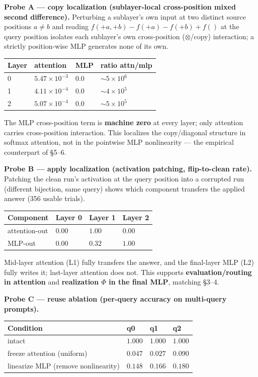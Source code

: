 \documentclass[a4paper,11pt]{article}
\begin{document}
\textbf{Probe A --- copy localization (sublayer-local cross-position
mixed second difference).} Perturbing a sublayer's own input at two
distinct source positions \(a\neq b\) and reading
\(f(+a,+b)-f(+a)-f(+b)+f()\) at the query position isolates each
sublayer's own cross-position (\(\otimes\)/copy) interaction; a strictly
position-wise MLP generates none of its own.

\begin{longtable}[]{@{}llll@{}}
\toprule
Layer & attention & MLP & ratio attn/mlp\tabularnewline
\midrule
\endhead
0 & \(5.47\times10^{-3}\) & \(0.0\) &
\(\sim 5\times10^{6}\)\tabularnewline
1 & \(4.11\times10^{-4}\) & \(0.0\) &
\(\sim 4\times10^{5}\)\tabularnewline
2 & \(5.07\times10^{-4}\) & \(0.0\) &
\(\sim 5\times10^{5}\)\tabularnewline
\bottomrule
\end{longtable}

The MLP cross-position term is \textbf{machine zero} at every layer;
only attention carries cross-position interaction. This localizes the
copy/diagonal structure in softmax attention, not in the pointwise MLP
nonlinearity --- the empirical counterpart of §5--6.

\textbf{Probe B --- apply localization (activation patching,
flip-to-clean rate).} Patching the clean run's activation at the query
position into a corrupted run (different bijection, same query) shows
which component transfers the applied answer (356 usable trials).

\begin{longtable}[]{@{}llll@{}}
\toprule
Component & Layer 0 & Layer 1 & Layer 2\tabularnewline
\midrule
\endhead
attention-out & \(0.00\) & \(\mathbf{1.00}\) & \(0.00\)\tabularnewline
MLP-out & \(0.00\) & \(0.32\) & \(\mathbf{1.00}\)\tabularnewline
\bottomrule
\end{longtable}

Mid-layer attention (L1) fully transfers the answer, and the final-layer
MLP (L2) fully writes it; last-layer attention does not. This supports
\textbf{evaluation/routing in attention} and \textbf{realization
\(\Phi\) in the final MLP}, matching §3--4.

\textbf{Probe C --- reuse ablation (per-query accuracy on multi-query
prompts).}

\begin{longtable}[]{@{}llll@{}}
\toprule
Condition & q0 & q1 & q2\tabularnewline
\midrule
\endhead
intact & \(1.000\) & \(1.000\) & \(1.000\)\tabularnewline
freeze attention (uniform) & \(0.047\) & \(0.027\) &
\(0.090\)\tabularnewline
linearize MLP (remove nonlinearity) & \(0.148\) & \(0.166\) &
\(0.180\)\tabularnewline
\bottomrule
\end{longtable}
\end{document}
